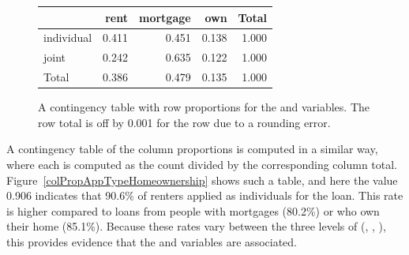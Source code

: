 \begin{figure}[h]
\centering
\begin{tabular}{l rrr r}
  \hline
  & rent & mortgage & own & Total \\
  \hline
  individual & 
      0.411 &
      0.451 &
      0.138 &
      1.000 \\
  joint &
      0.242 &
      0.635 &
      0.122 &
      1.000 \\
  \hline
  Total &
      0.386 &
      0.479 &
      0.135 &
      1.000 \\
  \hline
\end{tabular}
\caption{A contingency table with row proportions
    for the  and
     variables.
    The row total is off by 0.001 for the
     row due to a rounding error.}
\label{rowPropAppTypeHomeownership}
\end{figure}

A contingency table of the column proportions is computed in a similar way, where each  is computed as the count divided by the corresponding column total. Figure~\ref{colPropAppTypeHomeownership} shows such a table, and here the value 0.906 indicates that 90.6\% of renters applied as individuals for the loan. This rate is higher compared to loans from people with mortgages (80.2\%) or who own their home (85.1\%). Because these rates vary between the three levels of  (, , ), this provides evidence that the  and  variables are associated.

